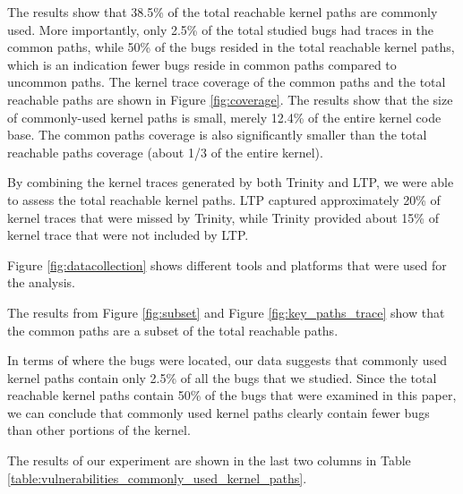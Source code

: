 The results show that 38.5\% of the total reachable kernel paths are commonly
used. More importantly, only 2.5\% of the total studied bugs had traces
in the common paths, while 50\% of the bugs resided in the total reachable
kernel paths, which is an indication fewer bugs reside in common paths
compared to uncommon paths. The kernel trace coverage of the common paths and
the total reachable paths are shown in Figure \ref{fig:coverage}.
The results show that the size of commonly-used kernel paths is small,
merely 12.4\% of the entire kernel code base.
The common paths coverage is also significantly smaller than
the total reachable paths coverage (about 1/3 of the entire kernel).

By combining the kernel traces generated by both Trinity and LTP, we were able
to assess the total reachable kernel paths. LTP captured approximately 20\% of kernel
traces that were missed by Trinity, while Trinity
provided about 15\% of kernel trace that were not included by LTP.

Figure \ref{fig:datacollection} shows different tools and platforms that were used 
for the analysis.

The results from Figure \ref{fig:subset} and Figure \ref{fig:key_paths_trace}
show that the common paths are a subset of the
total reachable paths.

In terms of where the bugs were located, our data suggests that
commonly used kernel paths
contain only 2.5\% of all the bugs that we studied.
Since the total reachable kernel paths contain 50\% of the bugs that were
examined in this paper, we can conclude
that commonly used kernel paths clearly contain fewer bugs than other
portions of the kernel.

The results of our experiment are shown in the last two columns in 
Table \ref{table:vulnerabilities_commonly_used_kernel_paths}.

%

